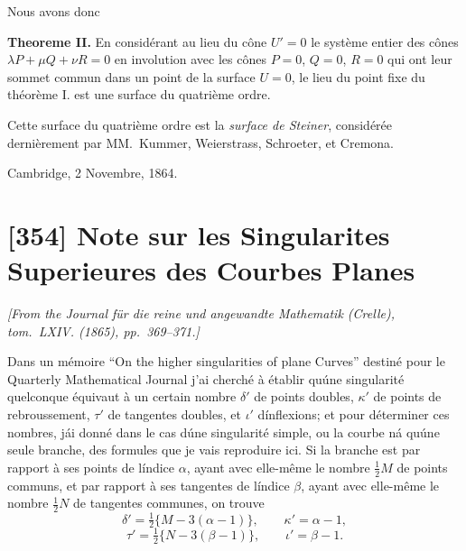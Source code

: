 \documentclass[11pt,a4paper]{article}
\theoremstyle{plain}
\begin{document}
Nous avons donc

\medskip
\noindent\textbf{Theoreme II.} En consid\'erant au lieu du c\^one $U'=0$ le syst\`eme entier des c\^ones $\lambda P + \mu Q + \nu R = 0$ en involution avec les c\^ones $P=0$, $Q=0$, $R=0$ qui ont leur sommet commun dans un point de la surface $U=0$, le lieu du point fixe du th\'eor\`eme I. est une surface du quatri\`eme ordre.

Cette surface du quatri\`eme ordre est la \textit{surface de Steiner}, consid\'er\'ee derni\`erement par MM.~Kummer, Weierstrass, Schroeter, et Cremona.

\begin{flushright}
Cambridge, 2 Novembre, 1864.
\end{flushright}


\newpage
\section*{[354] Note sur les Singularites Superieures des Courbes Planes}

\begin{flushright}
\textit{[From the Journal f\"ur die reine und angewandte Mathematik (Crelle),\\
tom.~LXIV. (1865), pp.~369--371.]}
\end{flushright}

Dans un m\'emoire ``On the higher singularities of plane Curves'' destin\'e pour le Quarterly Mathematical Journal j'ai cherch\'e \`a \'etablir qu\'une singularit\'e quelconque \'equivaut \`a un certain nombre $\delta'$ de points doubles, $\kappa'$ de points de rebroussement, $\tau'$ de tangentes doubles, et $\iota'$ d\'inflexions; et pour d\'eterminer ces nombres, j\'ai donn\'e dans le cas d\'une singularit\'e simple, ou la courbe n\'a qu\'une seule branche, des formules que je vais reproduire ici. Si la branche est par rapport \`a ses points de l\'indice $\alpha$, ayant avec elle-m\^eme le nombre $\tfrac{1}{2}M$ de points communs, et par rapport \`a ses tangentes de l\'indice $\beta$, ayant avec elle-m\^eme le nombre $\tfrac{1}{2}N$ de tangentes communes, on trouve
\[
\delta' = \tfrac{1}{2}\{M - 3(\alpha-1)\}, \qquad \kappa' = \alpha - 1,
\]
\[
\tau' = \tfrac{1}{2}\{N - 3(\beta-1)\}, \qquad \iota' = \beta - 1.
\]
\end{document}
